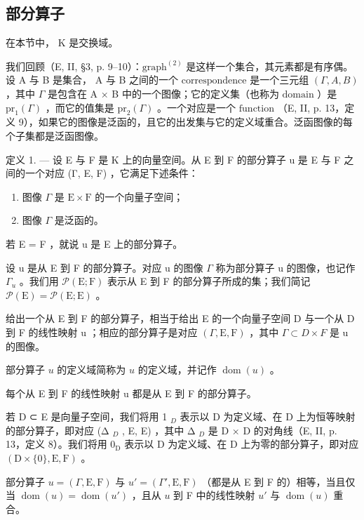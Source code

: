 \subsection{部分算子}

在本节中， K 是交换域。

我们回顾（E, II, §3, p. 9–10）：\(\text{graph}^{(2)}\) 是这样一个集合，其元素都是有序偶。设 A 与 B 是集合， A 与 B 之间的一个 \(\text{correspondence}\) 是一个三元组 \((\Gamma, A, B)\) ，其中 \(\Gamma\) 是包含在 A × B 中的一个图像；它的定义集（也称为 \(\text{domain}\) ）是 \(\text{pr}_1(\Gamma)\) ，而它的值集是 \(\text{pr}_2(\Gamma)\) 。一个对应是一个 \(\text{function}\) （E, II, p. 13，定义 9），如果它的图像是泛函的，且它的出发集与它的定义域重合。泛函图像的每个子集都是泛函图像。

定义 1. --- 设 E 与 F 是 K 上的向量空间。从 E 到 F 的部分算子 u 是 E 与 F 之间的一个对应 (Γ, E, F) ，它满足下述条件：

\begin{enumerate}
\def\labelenumi{(\roman{enumi})}
\item
  图像 \(\Gamma\) 是 \(\mathrm{E} \times \mathrm{F}\) 的一个向量子空间；
\item
  图像 \(\Gamma\) 是泛函的。
\end{enumerate}

若 E = F ，就说 u 是 E 上的部分算子。

设 u 是从 E 到 F 的部分算子。对应 u 的图像 \(\Gamma\) 称为部分算子 u 的图像，也记作 \(\Gamma_{u}\) 。我们用 \(\mathcal{P}(\mathrm{E};\mathrm{F})\) 表示从 E 到 F 的部分算子所成的集；我们简记 \(\mathcal{P}(\mathrm{E}) = \mathcal{P}(\mathrm{E};\mathrm{E})\) 。

给出一个从 E 到 F 的部分算子，相当于给出 E 的一个向量子空间 D 与一个从 D 到 F 的线性映射 u ；相应的部分算子是对应 \((\Gamma, \mathrm{E}, \mathrm{F})\) ，其中 \(\Gamma \subset D \times F\) 是 u 的图像。

部分算子 \(u\) 的定义域简称为 \(u\) 的定义域，并记作 \(\operatorname{dom}(u)\) 。

每个从 E 到 F 的线性映射 u 都是从 E 到 F 的部分算子。

若 D ⊂ E 是向量子空间，我们将用 1 \(_{D}\) 表示以 D 为定义域、在 D 上为恒等映射的部分算子，即对应 (Δ \(_{D}\) , E, E) ，其中 Δ \(_{D}\) 是 D × D 的对角线（E, II, p. 13，定义 8）。我们将用 \(0_{\mathrm{D}}\) 表示以 D 为定义域、在 D 上为零的部分算子，即对应 \((\mathrm{D} \times \{0\}, \mathrm{E}, \mathrm{F})\) 。

部分算子 \(u = (\Gamma, \mathrm{E}, \mathrm{F})\) 与 \(u' = (\Gamma', \mathrm{E}, \mathrm{F})\) （都是从 E 到 F 的）相等，当且仅当 \(\operatorname{dom}(u) = \operatorname{dom}(u')\) ，且从 \(u\) 到 F 中的线性映射 \(u'\) 与 \(\operatorname{dom}(u)\) 重合。

